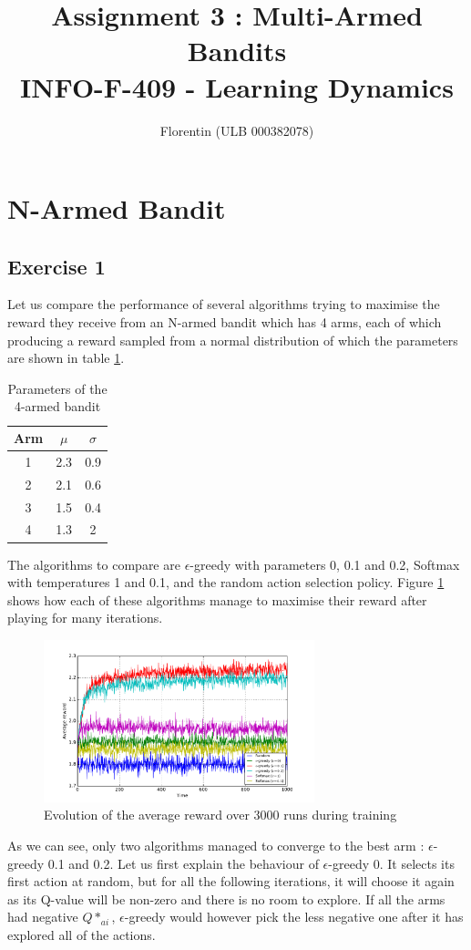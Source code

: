 \documentclass[a4paper]{article}
\title{
    Assignment 3 : Multi-Armed Bandits\\
    \small INFO-F-409 - Learning Dynamics
}
\author{Florentin \bsc{Hennecker} (ULB 000382078)}
\date{}
\begin{document}
\maketitle

\section{N-Armed Bandit}
\subsection{Exercise 1}

Let us compare the performance of several algorithms trying to maximise the
reward they receive from an N-armed bandit which has 4 arms, each of which 
producing a reward sampled from a normal distribution of which the parameters
are shown in table \ref{banditparams}.

\begin{table}[H]
\centering
\begin{tabular}{c|c|c}
	\textbf{Arm} & $\mu$ & $\sigma$ \\
	\hline
	1 & 2.3 & 0.9\\
	2 & 2.1 & 0.6\\
	3 & 1.5 & 0.4\\
	4 & 1.3 & 2\\
\end{tabular}
\caption{Parameters of the 4-armed bandit}
\label{banditparams}
\end{table}

The algorithms to compare are $\epsilon$-greedy with parameters 0, 0.1 and 0.2,
Softmax with temperatures 1 and 0.1, and the random action selection policy.
Figure \ref{ex11perf} shows how each of these algorithms manage to maximise
their reward after playing for many iterations. 
\begin{figure}[H]
	\centering
	\includegraphics[width=0.7\textwidth]{./fig/ex1-1.pdf}
	\caption{Evolution of the average reward over 3000 runs during training}
	\label{ex11perf}
\end{figure}
As we can see, only two algorithms managed to converge to the best arm : 
$\epsilon$-greedy 0.1 and 0.2. Let us first explain the behaviour of 
$\epsilon$-greedy 0. It selects its first action at random, but for all the
following iterations, it will choose it again as its Q-value will be non-zero
and there is no room to explore. If all the arms had negative $Q*_{ai}$, 
$\epsilon$-greedy would however pick the less negative one after it has explored
all of the actions.\\
\end{document}
